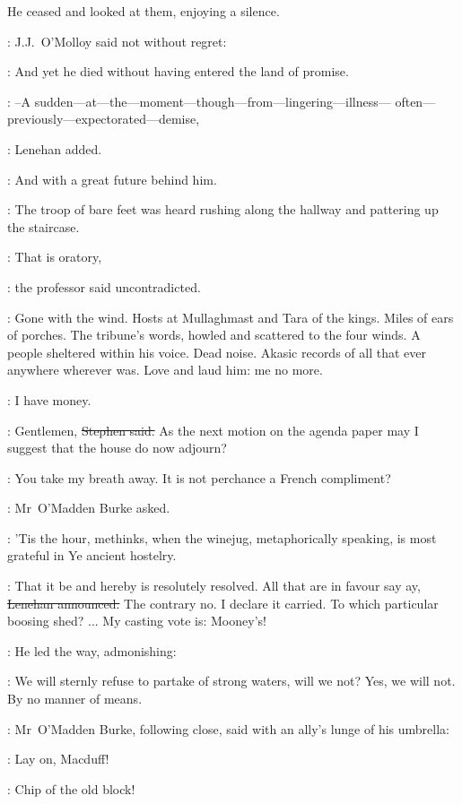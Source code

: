He ceased and looked at them, enjoying a silence.



:
J.J.~O'Molloy said
not without regret:

\jjom:
And yet he died
without having entered the land of promise.

\lenehan:
--A sudden---at---the---moment---though---from---lingering---illness---%
often---previously---expectorated---demise,

:
Lenehan added.

\lenehan:
And with a great future behind him.

:
The troop of bare feet was heard rushing along the hallway
and pattering up the staircase.

\machugh:
That is oratory,

:
the professor said uncontradicted.

\machugh:
Gone with the wind.
Hosts at Mullaghmast and Tara of the kings.
Miles of ears of porches.
The tribune's words,
howled and scattered to the four winds.
A people sheltered within his voice.
Dead noise.
Akasic records of all that ever anywhere wherever was.
Love and laud him: me no more.


\StephenInt:
I have money.

\Stephen:
Gentlemen,
\sout{Stephen said.}
As the next motion on the agenda paper
may I suggest that the house do now adjourn?

\omaddenburke:
You take my breath away.
It is not perchance a French compliment?

:
Mr~O'Madden Burke asked.

\omaddenburke:
'Tis the hour,
methinks,
when the winejug,
metaphorically speaking,
is most grateful in Ye ancient hostelry.

\lenehan:
That it be and hereby is resolutely resolved.
All that are in favour
say ay,
\sout{Lenehan announced.}
The contrary no.
I declare it carried.
To which particular boosing shed? ...
My casting vote is:
Mooney's!


:
He led the way,
admonishing:

\lenehan:
We will sternly refuse to partake of strong waters,
will we not?
Yes, we will not.
By no manner of means.


:
Mr~O'Madden Burke,
following close,
said with an ally's lunge of his umbrella:

\omaddenburke:
Lay on, Macduff!

\crawford:
Chip of the old block!

